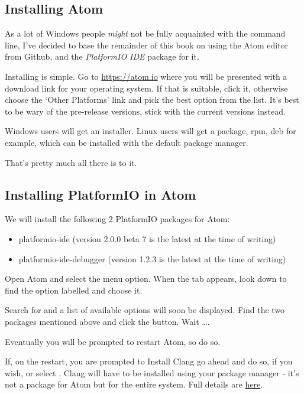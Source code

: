 \subsection{Installing Atom}\label{installing-atom}

As a lot of Windows people \emph{might} not be fully acquainted with the command
line, I've decided to base the remainder of this book on using the Atom editor
from Github, and the \emph{PlatformIO IDE} package for it. 

Installing is simple. Go to \href{https://atom.io}{https://atom.io} where you will be presented with a download link for your operating system. If that is suitable, click it, otherwise choose the `Other Platforms' link and pick the best option from the list. It's best to be wary of the pre-release versions, stick with the current versions instead.

Windows users will get an installer. Linux users will get a package, rpm, deb for example, which can be installed with the default package manager.

That's pretty much all there is to it.

\subsection{Installing PlatformIO in
Atom}\label{installing-platformio-in-atom}

We will install the following 2 PlatformIO packages for Atom:

\begin{itemize}
\item
  platformio-ide (version 2.0.0 beta 7 is the latest at the time of
  writing)
\item
  platformio-ide-debugger (version 1.2.3 is the latest at the time of
  writing)
\end{itemize}

Open Atom and select the  menu option.
When the  tab appears, look down to find the option labelled
 and choose it.

Search for  and a list of available options will soon be
displayed. Find the two packages mentioned above and click the 
button. Wait \ldots{}.

Eventually you will be prompted to restart Atom, so do so.

If, on the restart, you are prompted to Install Clang go ahead and do
so, if you wish, or select . Clang
will have to be installed using your package manager - it's not a
package for Atom but for the entire system. Full details are
\href{http://docs.platformio.org/en/latest/ide/atom.html\#ii-clang-for-intelligent-code-completion}{here}.

